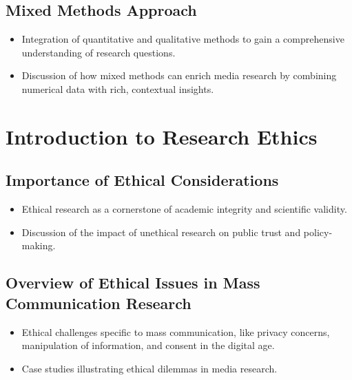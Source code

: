 \documentclass[
]{book}
\begin{document}
\hypertarget{mixed-methods-approach}{%
\subsection*{Mixed Methods Approach}\label{mixed-methods-approach}}

\begin{itemize}
\item
  Integration of quantitative and qualitative methods to gain a comprehensive understanding of research questions.
\item
  Discussion of how mixed methods can enrich media research by combining numerical data with rich, contextual insights.
\end{itemize}

\hypertarget{introduction-to-research-ethics}{%
\section*{Introduction to Research Ethics}\label{introduction-to-research-ethics}}

\hypertarget{importance-of-ethical-considerations}{%
\subsection*{Importance of Ethical Considerations}\label{importance-of-ethical-considerations}}

\begin{itemize}
\item
  Ethical research as a cornerstone of academic integrity and scientific validity.
\item
  Discussion of the impact of unethical research on public trust and policy-making.
\end{itemize}

\hypertarget{overview-of-ethical-issues-in-mass-communication-research}{%
\subsection*{Overview of Ethical Issues in Mass Communication Research}\label{overview-of-ethical-issues-in-mass-communication-research}}

\begin{itemize}
\item
  Ethical challenges specific to mass communication, like privacy concerns, manipulation of information, and consent in the digital age.
\item
  Case studies illustrating ethical dilemmas in media research.
\end{itemize}
\end{document}
